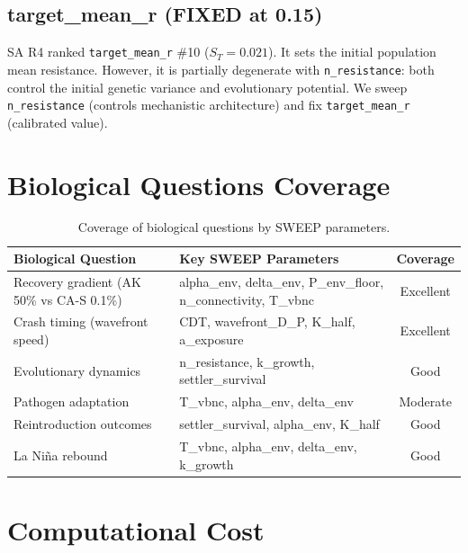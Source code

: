 \documentclass[11pt,a4paper]{article}
\begin{document}
\subsection{target\_mean\_r (FIXED at 0.15)}

SA R4 ranked \texttt{target\_mean\_r} \#10 ($S_T = 0.021$). It sets the initial population mean resistance. However, it is partially degenerate with \texttt{n\_resistance}: both control the initial genetic variance and evolutionary potential. We sweep \texttt{n\_resistance} (controls mechanistic architecture) and fix \texttt{target\_mean\_r} (calibrated value).

\section{Biological Questions Coverage}

\begin{table}[H]
\centering
\caption{Coverage of biological questions by SWEEP parameters.}
\begin{tabular}{p{4.5cm}p{7cm}c}
\toprule
\textbf{Biological Question} & \textbf{Key SWEEP Parameters} & \textbf{Coverage} \\
\midrule
Recovery gradient (AK 50\% vs CA-S 0.1\%) & alpha\_env, delta\_env, P\_env\_floor, n\_connectivity, T\_vbnc & Excellent \\
Crash timing (wavefront speed) & CDT, wavefront\_D\_P, K\_half, a\_exposure & Excellent \\
Evolutionary dynamics & n\_resistance, k\_growth, settler\_survival & Good \\
Pathogen adaptation & T\_vbnc, alpha\_env, delta\_env & Moderate \\
Reintroduction outcomes & settler\_survival, alpha\_env, K\_half & Good \\
La Ni\~na rebound & T\_vbnc, alpha\_env, delta\_env, k\_growth & Good \\
\bottomrule
\end{tabular}
\end{table}

\section{Computational Cost}
\end{document}
